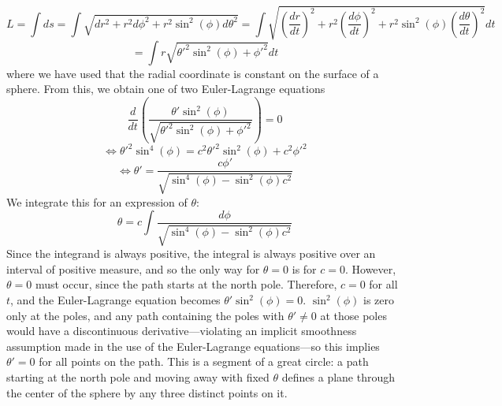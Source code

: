 \documentclass{article}
\begin{document}
\[L=\int ds=\int\sqrt{dr^2+r^2d\phi^2+r^2\sin^2(\phi)d\theta^2}=\int\sqrt{\left( \frac{dr}{dt} \right)^2+r^2\left( \frac{d\phi}{dt} \right)^2+r^2\sin^2(\phi)\left( \frac{d\theta}{dt}\right)^2}dt\]
\[=\int r\sqrt{\theta'^2\sin^2(\phi)+\phi'^2}dt\]
where we have used that the radial coordinate is constant on the surface of a sphere.
From this, we obtain one of two Euler-Lagrange equations
\[\frac{d}{dt}\left( \frac{\theta'\sin^2(\phi)}{\sqrt{\theta'^2\sin^2(\phi)+\phi'^2}} \right) = 0\]
\[\Leftrightarrow \theta'^2\sin^4(\phi)=c^2\theta'^2\sin^2(\phi)+c^2\phi'^2\]
\[\Leftrightarrow \theta'=\frac{c\phi'}{\sqrt{\sin^4(\phi)-\sin^2(\phi)c^2}}\]
We integrate this for an expression of $\theta$:
\[\theta=c\int\frac{d\phi}{\sqrt{\sin^4(\phi)-\sin^2(\phi)c^2}}\]
Since the integrand is always positive, the integral is always positive over an interval of positive measure, and so the only way for $\theta=0$ is for $c=0$. However, $\theta = 0$ must occur, since the path starts at the north pole. Therefore, $c=0$ for all $t$, and the Euler-Lagrange equation becomes $\theta'\sin^2(\phi)=0$. $\sin^2(\phi)$ is zero only at the poles, and any path containing the poles with $\theta'\neq 0$ at those poles would have a discontinuous derivative---violating an implicit smoothness assumption made in the use of the Euler-Lagrange equations---so this implies $\theta'=0$ for all points on the path. This is a segment of a great circle: a path starting at the north pole and moving away with fixed $\theta$ defines a plane through the center of the sphere by any three distinct points on it.
\end{document}
